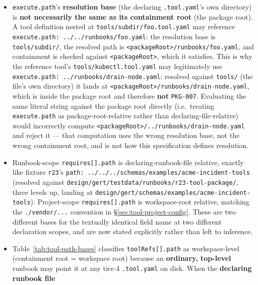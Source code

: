 \begin{itemize}
  \item \texttt{execute.path}'s \textbf{resolution base} (the declaring
        \texttt{.tool.yaml}'s own directory) is \textbf{not necessarily the
        same as its containment root} (the package root). A tool definition
        nested at \texttt{tools/subdir/foo.tool.yaml} may reference
        \texttt{execute.path: ../../runbooks/foo.yaml}: the resolution base
        is \texttt{tools/subdir/}, the resolved path is
        \texttt{<packageRoot>/runbooks/foo.yaml}, and containment is checked
        against \texttt{<packageRoot>}, which it satisfies. This is why the
        reference tool's \texttt{tools/kubectl.tool.yaml} may legitimately
        use \texttt{execute.path: ../runbooks/drain-node.yaml}: resolved
        against \texttt{tools/} (the file's own directory) it lands at
        \texttt{<packageRoot>/runbooks/drain-node.yaml}, which is inside the
        package root and therefore \textbf{not} \texttt{PKG-007}. Evaluating
        the same literal string against the package root directly (i.e.\
        treating \texttt{execute.path} as package-root-relative rather than
        declaring-file-relative) would incorrectly compute
        \texttt{<packageRoot>/../runbooks/drain-node.yaml} and reject it ---
        that computation uses the wrong resolution base, not the wrong
        containment root, and is not how this specification defines
        resolution.
  \item Runbook-scope \texttt{requires[].path} is declaring-runbook-file
        relative, exactly like fixture \texttt{r23}'s
        \texttt{path: ../../../schemas/examples/acme-incident-tools}
        (resolved against
        \texttt{design/gert/testdata/runbooks/r23-tool-package/}, three
        levels up, landing at
        \texttt{design/gert/schemas/examples/acme-incident-tools}). Project-scope
        \texttt{requires[].path} is workspace-root relative, matching the
        \texttt{./vendor/...} convention in \S\ref{sec:tool-project-config}.
        These are two different bases for the textually identical field
        name at two different declaration scopes, and are now stated
        explicitly rather than left to inference.
  \item Table~\ref{tab:tool-path-bases} classifies \texttt{toolRefs[].path}
        as workspace-level (containment root = workspace root) because an
        \textbf{ordinary, top-level} runbook may point it at any tier-4
        \texttt{.tool.yaml} on disk. When the \textbf{declaring runbook file
}
\end{itemize}

